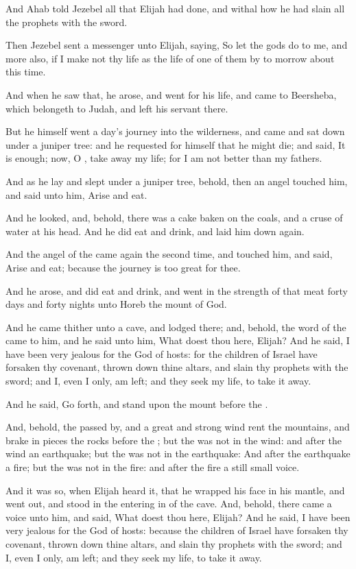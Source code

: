 \Chapter
\Verse And Ahab told Jezebel all that Elijah had done, and withal how he had slain all the prophets with the sword.

\Verse Then Jezebel sent a messenger unto Elijah, saying, So let the gods do to me, and more also, if I make not thy life as the life of one of them by to morrow about this time.

\Verse And when he saw that, he arose, and went for his life, and came to Beersheba, which belongeth to Judah, and left his servant there.

\Verse But he himself went a day's journey into the wilderness, and came and sat down under a juniper tree: and he requested for himself that he might die; and said, It is enough; now, O \LORD, take away my life; for I am not better than my fathers.

\Verse And as he lay and slept under a juniper tree, behold, then an angel touched him, and said unto him, Arise and eat.

\Verse And he looked, and, behold, there was a cake baken on the coals, and a cruse of water at his head. And he did eat and drink, and laid him down again.

\Verse And the angel of the \LORD came again the second time, and touched him, and said, Arise and eat; because the journey is too great for thee.

\Verse And he arose, and did eat and drink, and went in the strength of that meat forty days and forty nights unto Horeb the mount of God.

\Verse And he came thither unto a cave, and lodged there; and, behold, the word of the \LORD came to him, and he said unto him, What doest thou here, Elijah?  \Verse And he said, I have been very jealous for the \LORD God of hosts: for the children of Israel have forsaken thy covenant, thrown down thine altars, and slain thy prophets with the sword; and I, even I only, am left; and they seek my life, to take it away.

\Verse And he said, Go forth, and stand upon the mount before the \LORD.

And, behold, the \LORD passed by, and a great and strong wind rent the mountains, and brake in pieces the rocks before the \LORD; but the \LORD was not in the wind: and after the wind an earthquake; but the \LORD was not in the earthquake: \Verse And after the earthquake a fire; but the \LORD was not in the fire: and after the fire a still small voice.

\Verse And it was so, when Elijah heard it, that he wrapped his face in his mantle, and went out, and stood in the entering in of the cave.  And, behold, there came a voice unto him, and said, What doest thou here, Elijah?  \Verse And he said, I have been very jealous for the \LORD God of hosts: because the children of Israel have forsaken thy covenant, thrown down thine altars, and slain thy prophets with the sword; and I, even I only, am left; and they seek my life, to take it away.

